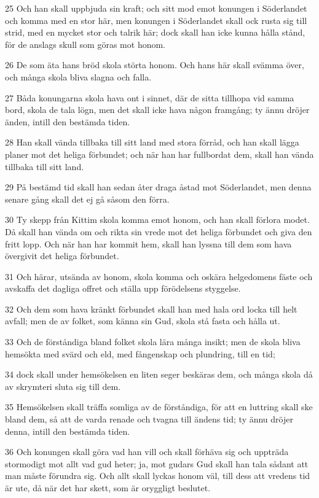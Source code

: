 \par 25 Och han skall uppbjuda sin kraft; och sitt mod emot konungen i Söderlandet och komma med en stor här, men konungen i Söderlandet skall ock rusta sig till strid, med en mycket stor och talrik här; dock skall han icke kunna hålla stånd, för de anslags skull som göras mot honom.
\par 26 De som äta hans bröd skola störta honom. Och hans här skall svämma över, och många skola bliva slagna och falla.
\par 27 Båda konungarna skola hava ont i sinnet, där de sitta tillhopa vid samma bord, skola de tala lögn, men det skall icke hava någon framgång; ty ännu dröjer änden, intill den bestämda tiden.
\par 28 Han skall vända tillbaka till sitt land med stora förråd, och han skall lägga planer mot det heliga förbundet; och när han har fullbordat dem, skall han vända tillbaka till sitt land.
\par 29 På bestämd tid skall han sedan åter draga åstad mot Söderlandet, men denna senare gång skall det ej gå såsom den förra.
\par 30 Ty skepp från Kittim skola komma emot honom, och han skall förlora modet. Då skall han vända om och rikta sin vrede mot det heliga förbundet och giva den fritt lopp. Och när han har kommit hem, skall han lyssna till dem som hava övergivit det heliga förbundet.
\par 31 Och härar, utsända av honom, skola komma och oskära helgedomens fäste och avskaffa det dagliga offret och ställa upp förödelsens styggelse.
\par 32 Och dem som hava kränkt förbundet skall han med hala ord locka till helt avfall; men de av folket, som känna sin Gud, skola stå fasta och hålla ut.
\par 33 Och de förståndiga bland folket skola lära många insikt; men de skola bliva hemsökta med svärd och eld, med fångenskap och plundring, till en tid;
\par 34 dock skall under hemsökelsen en liten seger beskäras dem, och många skola då av skrymteri sluta sig till dem.
\par 35 Hemsökelsen skall träffa somliga av de förståndiga, för att en luttring skall ske bland dem, så att de varda renade och tvagna till ändens tid; ty ännu dröjer denna, intill den bestämda tiden.
\par 36 Och konungen skall göra vad han vill och skall förhäva sig och uppträda stormodigt mot allt vad gud heter; ja, mot gudars Gud skall han tala sådant att man måste förundra sig. Och allt skall lyckas honom väl, till dess att vredens tid är ute, då när det har skett, som är oryggligt beslutet.
